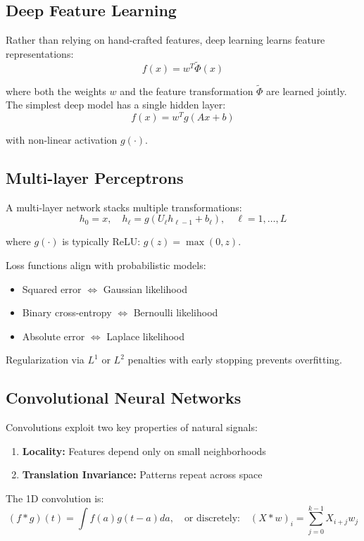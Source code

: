 \documentclass[12pt,a4paper]{article}
\theoremstyle{definition}
\begin{document}
\subsection{Deep Feature Learning}

Rather than relying on hand-crafted features, deep learning learns feature representations:
\[
f(x) = w^T \tilde{\Phi}(x)
\]

where both the weights $w$ and the feature transformation $\tilde{\Phi}$ are learned jointly. The simplest deep model has a single hidden layer:
\[
f(x) = w^T g(Ax + b)
\]

with non-linear activation $g(\cdot)$.

\subsection{Multi-layer Perceptrons}

A multi-layer network stacks multiple transformations:
\[
h_0 = x, \quad h_\ell = g(U_\ell h_{\ell-1} + b_\ell), \quad \ell = 1, \ldots, L
\]

where $g(\cdot)$ is typically ReLU: $g(z) = \max(0, z)$.

Loss functions align with probabilistic models:
\begin{itemize}
  \item Squared error $\Leftrightarrow$ Gaussian likelihood
  \item Binary cross-entropy $\Leftrightarrow$ Bernoulli likelihood  
  \item Absolute error $\Leftrightarrow$ Laplace likelihood
\end{itemize}

Regularization via $L^1$ or $L^2$ penalties with early stopping prevents overfitting.

\subsection{Convolutional Neural Networks}

Convolutions exploit two key properties of natural signals:
\begin{enumerate}
  \item \textbf{Locality:} Features depend only on small neighborhoods
  \item \textbf{Translation Invariance:} Patterns repeat across space
\end{enumerate}

The 1D convolution is:
\[
(f * g)(t) = \int f(a) g(t - a) da, \quad \text{or discretely:} \quad (X * w)_i = \sum_{j=0}^{k-1} X_{i+j} w_j
\]
\end{document}
